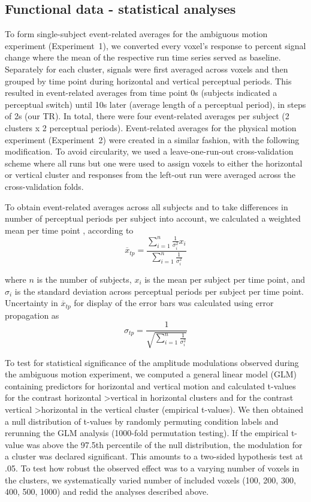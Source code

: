\subsection{Functional data - statistical analyses}
To form single-subject event-related averages for the ambiguous motion experiment (Experiment~1), we converted every voxel's response to percent signal change where the mean of the respective run time series served as baseline. Separately for each cluster, signals were first averaged across voxels and then grouped by time point during horizontal and vertical perceptual periods. This resulted in event-related averages from time point 0s (subjects indicated a perceptual switch) until 10s later (average length of a perceptual period), in steps of 2s (our TR). In total, there were four event-related averages per subject (2 clusters x 2 perceptual periods). Event-related averages for the physical motion experiment (Experiment~2) were created in a similar fashion, with the following modification. To avoid circularity, we used a leave-one-run-out cross-validation scheme where all runs but one were used to assign voxels to either the horizontal or vertical cluster and responses from the left-out run were averaged across the cross-validation folds.

To obtain event-related averages across all subjects and to take differences in number of perceptual periods per subject into account, we calculated a weighted mean per time point \parencite{Cohen1998}, according to 
\begin{equation}
\overline{x}_{tp} = \frac{\sum\limits_{i=1}^n \frac{1}{\sigma_i^2} x_i}{\sum\limits_{i=1}^n \frac{1}{\sigma_i^2}}
\end{equation}

where $n$ is the number of subjects, $x_i$ is the mean per subject per time point, and $\sigma_i$ is the standard deviation across perceptual periods per subject per time point. Uncertainty in $\overline{x}_{tp}$ for display of the error bars was calculated using error propagation \parencite{Cohen1998} as
\begin{equation}
\sigma_{tp} = \frac{1}{\sqrt{\sum\limits_{i=1}^n \frac{1}{\sigma_i^2}}}
\end{equation}

To test for statistical significance of the amplitude modulations observed during the ambiguous motion experiment, we computed a general linear model (GLM) containing predictors for horizontal and vertical motion and calculated t-values for the contrast horizontal \textgreater vertical in horizontal clusters and for the contrast vertical \textgreater horizontal in the vertical cluster (empirical t-values). We then obtained a null distribution of t-values by randomly permuting condition labels and rerunning the GLM analysis (1000-fold permutation testing). If the empirical t-value was above the 97.5th percentile of the null distribution, the modulation for a cluster was declared significant. This amounts to a two-sided hypothesis test at .05. To test how robust the observed effect was to a varying number of voxels in the clusters, we systematically varied number of included voxels (100, 200, 300, 400, 500, 1000) and redid the analyses described above.

